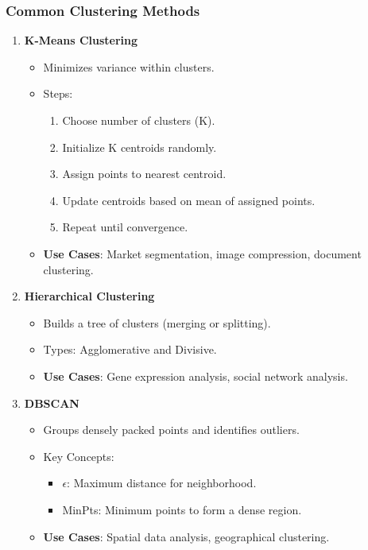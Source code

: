 \documentclass[aspectratio=169]{beamer}
\begin{document}
\begin{frame}[fragile]
    \frametitle{Common Clustering Methods}
    \begin{enumerate}
        \item \textbf{K-Means Clustering}
            \begin{itemize}
                \item Minimizes variance within clusters.
                \item Steps:
                \begin{enumerate}
                    \item Choose number of clusters (K).
                    \item Initialize K centroids randomly.
                    \item Assign points to nearest centroid.
                    \item Update centroids based on mean of assigned points.
                    \item Repeat until convergence.
                \end{enumerate}
                \item \textbf{Use Cases}: Market segmentation, image compression, document clustering.
            \end{itemize}
        \item \textbf{Hierarchical Clustering}
            \begin{itemize}
                \item Builds a tree of clusters (merging or splitting).
                \item Types: Agglomerative and Divisive.
                \item \textbf{Use Cases}: Gene expression analysis, social network analysis.
            \end{itemize}
        \item \textbf{DBSCAN}
            \begin{itemize}
                \item Groups densely packed points and identifies outliers.
                \item Key Concepts:
                \begin{itemize}
                    \item $\epsilon$: Maximum distance for neighborhood.
                    \item MinPts: Minimum points to form a dense region.
                \end{itemize}
                \item \textbf{Use Cases}: Spatial data analysis, geographical clustering.
            \end{itemize}
    \end{enumerate}
\end{frame}
\end{document}
